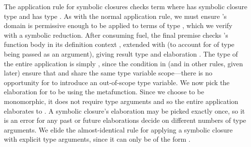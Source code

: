 The application rule for symbolic closures
\ltiSCAppInfClosure
checks term \ltiapp{\ltiF{}}{\ltiE{}}
where \ltiF{} has symbolic closure type
                      {\ltiClosureWithStkID{\ltiEnvp{}}
                                           {\ltiClosureID{}}
                                           {\ltiufun{\ltivar{}}{\ltiEp{}}}}
                                           and 
\ltiE{} has type \ltiT{}.
As with the normal application rule,
we must ensure \ltiF{}'s domain is permissive enough to be
applied to terms of type \ltiT{}, which
we verify with a symbolic reduction.
After consuming fuel, the final premise checks \ltiClosureID{}'s
function body \ltiEp{} in its definition context \ltiEnvp{},
extended with \hastype{\ltivar{}}{\ltiT{}} (to account for
\ltiE{} of type \ltiT{} being passed as an argument), giving result type \ltiS{}
and elaboration \ltiFpp{}.
The type of the entire application is simply \ltiS{}, since
the condition in \ltiSCAbs (and in other rules, given later) ensure that
\ltiEnv{} and \ltiEnvp{} share the same type variable scope---there
is no opportunity for \ltiS{} to introduce an out-of-scope type variable.
We now pick the elaboration for \ltiClosureID{}
to be
{\ltifuntparamargrettype
                                 {}
                                 {\ltivar{}}
                                 {\ltiT{}}
                                 {\ltiS{}}
                                 {\ltiFpp{}}}
using the \ltiupdateClosureCacheSinglesymbol metafunction.
Since we choose \ltiClosureID{} to be monomorphic, it does
not require type arguments
and so
the entire application elaborates to
                      {\ltiappinst{\ltiFp{}}
                                  {}
                                  {\ltiEpp{}}}.
A symbolic closure's elaboration may be picked exactly once,
so it is an error for any past or future elaborations decide
on different numbers of type arguments.
We elide the almost-identical rule \ltiSCAppClosure for applying a symbolic closure
with explicit type arguments,
since it can only be of the form \ltiappinst{\ltiF{}}{}{\ltiE{}}.


